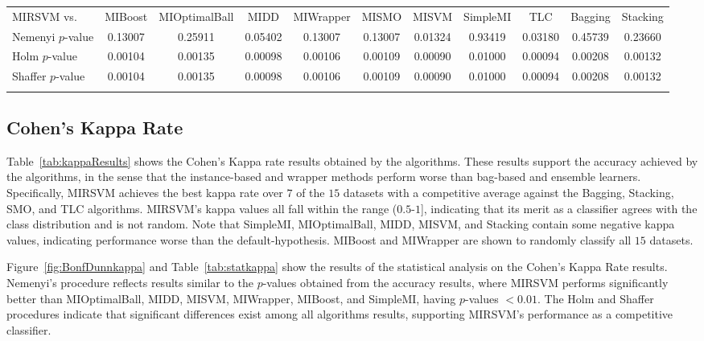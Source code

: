 \begin{table}[h!]
{}
\label{fig:BonfDunnrec}
\label{tab:statrec}
\scriptsize
\begin{tabularx}{\textwidth}{lcccccccccc}\noalign{\smallskip}\hline\noalign{\smallskip}
MIRSVM vs. & MIBoost & MIOptimalBall & MIDD & MIWrapper & MISMO & MISVM & SimpleMI & TLC & Bagging & Stacking\\
\noalign{\smallskip}\hline\noalign{\smallskip}
Nemenyi $p$-value & 0.13007 & 0.25911 & 0.05402 & 0.13007 & 0.13007 & 0.01324 & 0.93419 & 0.03180 & 0.45739 & 0.23660\\
Holm $p$-value & 0.00104 & 0.00135 & 0.00098 & 0.00106 & 0.00109 & 0.00090 & 0.01000 & 0.00094 & 0.00208 & 0.00132\\
Shaffer $p$-value & 0.00104 & 0.00135 & 0.00098 & 0.00106 & 0.00109 & 0.00090 & 0.01000 & 0.00094 & 0.00208 & 0.00132\\
\noalign{\smallskip}\hline\noalign{\smallskip}
\end{tabularx}
\end{table}

\subsection{Cohen's Kappa Rate}
Table~\ref{tab:kappaResults} shows the Cohen's Kappa rate results obtained by the algorithms. These results support the accuracy achieved by the algorithms, in the sense that the instance-based and wrapper methods perform worse than bag-based and ensemble learners. Specifically, MIRSVM achieves the best kappa rate over $7$ of the $15$ datasets with a competitive average against the Bagging, Stacking, SMO, and TLC algorithms. MIRSVM's kappa values all fall within the range ($0.5$-$1$], indicating that its merit as a classifier agrees with the class distribution and is not random. Note that SimpleMI, MIOptimalBall, MIDD, MISVM, and Stacking contain some negative kappa values, indicating performance worse than the default-hypothesis. MIBoost and MIWrapper are shown to randomly classify all $15$ datasets. 

Figure~\ref{fig:BonfDunnkappa} and Table~\ref{tab:statkappa} show the results of the statistical analysis on the Cohen's Kappa Rate results. Nemenyi's procedure reflects results similar to the $p$-values obtained from the accuracy results, where MIRSVM performs significantly better than MIOptimalBall, MIDD, MISVM, MIWrapper, MIBoost, and SimpleMI, having $p$-values $< 0.01$. The Holm and Shaffer procedures indicate that significant differences exist among all algorithms results, supporting MIRSVM's performance as a competitive classifier.

